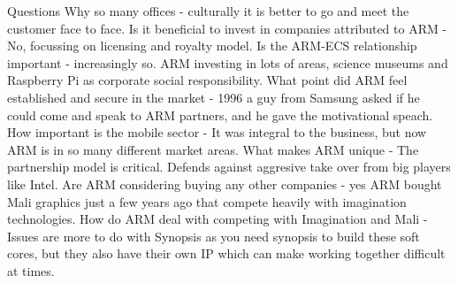 \documentclass{elec6049Report}     %
\begin{document}
Questions
Why so many offices - culturally it is better to go and meet the customer face to  face.
Is it beneficial to invest in companies attributed to ARM - No, focussing on licensing and royalty model.
Is the ARM-ECS relationship important - increasingly so. ARM investing in lots of areas, science museums and Raspberry Pi as corporate social responsibility.
What point did ARM feel established and secure in the market - 1996 a guy from Samsung asked if he could come and speak to ARM partners, and he gave the motivational speach.
How important is the mobile sector - It was integral to the business, but now ARM is in so many different market areas.
What makes ARM unique - The partnership model is critical. Defends against aggresive take over from big players like Intel.
Are ARM considering buying any other companies - yes ARM bought Mali graphics just a few years ago that compete heavily with imagination technologies.
How do ARM deal with competing with Imagination and Mali - Issues are more to do with Synopsis as you need synopsis to build these soft cores, but they also have their own IP which can make working together difficult at times.
\end{document}
